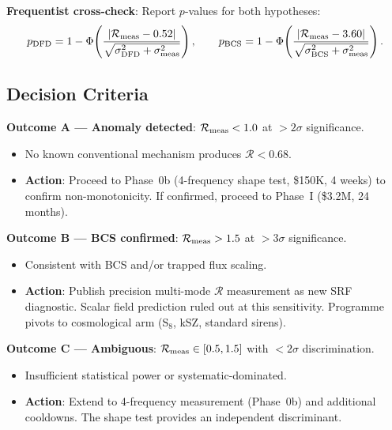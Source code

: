 \documentclass[11pt]{article}
\newcommand{\Rq}{\mathcal{R}}
\begin{document}
\textbf{Frequentist cross-check}: Report $p$-values for both hypotheses:
\begin{equation}
p_{\rm DFD} = 1 - \Phi\!\left(\frac{|\Rq_{\rm meas} - 0.52|}
{\sqrt{\sigma_{\rm DFD}^2 + \sigma_{\rm meas}^2}}\right), \qquad
p_{\rm BCS} = 1 - \Phi\!\left(\frac{|\Rq_{\rm meas} - 3.60|}
{\sqrt{\sigma_{\rm BCS}^2 + \sigma_{\rm meas}^2}}\right).
\end{equation}

\subsection{Decision Criteria}

\begin{tcolorbox}[colback=yellow!5!white, colframe=orange!60!black,
  title=\textbf{PHASE 0 DECISION TREE}]

\textbf{Outcome A --- Anomaly detected}:
$\Rq_{\rm meas} < 1.0$ at $> 2\sigma$ significance.
\begin{itemize}[nosep]
\item No known conventional mechanism produces $\Rq < 0.68$.
\item \textbf{Action}: Proceed to Phase~0b (4-frequency shape test,
  \$150K, 4 weeks) to confirm non-monotonicity. If confirmed, proceed
  to Phase~I (\$3.2M, 24 months).
\end{itemize}

\textbf{Outcome B --- BCS confirmed}:
$\Rq_{\rm meas} > 1.5$ at $> 3\sigma$ significance.
\begin{itemize}[nosep]
\item Consistent with BCS and/or trapped flux scaling.
\item \textbf{Action}: Publish precision multi-mode $\Rq$ measurement
  as new SRF diagnostic. Scalar field prediction ruled out at this
  sensitivity. Programme pivots to cosmological arm (S$_8$, kSZ,
  standard sirens).
\end{itemize}

\textbf{Outcome C --- Ambiguous}:
$\Rq_{\rm meas} \in [0.5, 1.5]$ with $< 2\sigma$ discrimination.
\begin{itemize}[nosep]
\item Insufficient statistical power or systematic-dominated.
\item \textbf{Action}: Extend to 4-frequency measurement (Phase~0b)
  and additional cooldowns. The shape test provides an independent
  discriminant.
\end{itemize}

\end{tcolorbox}
\end{document}

